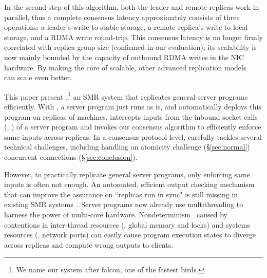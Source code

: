 In the second step of this algorithm, both the leader and remote replicas work 
in parallel, thus a complete consensus latency approximately consists of 
three operations: a leader's write to stable storage, a remote replica's write 
to local storage, and a RDMA write round-trip. This consensus 
latency is no longer firmly correlated with replica group size (confirmed in 
our evaluation); its scalability is now mainly bounded by the capacity of 
outbound RDMA writes in the NIC hardware. By making the core of \paxos 
scalable, other advanced replication 
models~\cite{epaxos:sosp13,mencius:osdi08,scatter:sosp11,manos:hotdep10} can 
scale even better.

This paper present \xxx,\footnote{We name our system after falcon, one of the 
fastest birds.} an SMR system that replicates general server programs 
efficiently. With \xxx, a server program just runs as is, and \xxx 
automatically deploys this program on replicas of machines. \xxx intercepts 
inputs from the inbound socket calls (\eg, \recv) of a server program and 
invokes our \paxos consensus algorithm to efficiently enforce same inputs 
across replicas. In a consensus protocol level, \xxx carefully tackles several 
technical challenges, including handling an atomicity challenge 
(\S\ref{sec:normal}) concurrent connections (\S\ref{sec:conclusion}).


However, to practically replicate general server programs, only enforcing same 
inputs is often not enough. An automated, efficient output checking mechanism 
that can improve the assurance on ``replicas run in sync" is still missing in 
existing SMR 
systems~\cite{calvin:sigmod12,rex:eurosys14,crane:sosp15,dare:hpdc15}. Server 
programs now already use multithreading to harness the power of multi-core 
hardware. Nondeterminism~\cite{racepro:sosp11,dmp:asplos09,coredet:asplos10,
cui:tern:osdi10, kendo:asplos09,
dthreads:sosp11,peregrine:sosp11,parrot:sosp13,determinator:osdi10} caused by 
contentions in inter-thread resources (\eg, global memory and locks) and systems 
resources (\eg, network ports) can easily cause program execution states to 
diverge across replicas and compute wrong outputs to clients.

